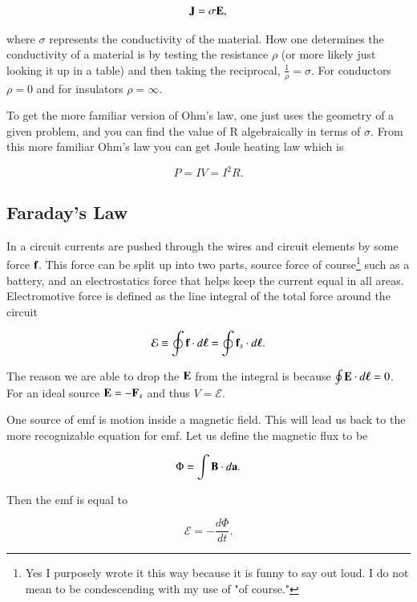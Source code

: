 \documentclass[preprint, review,12pt]{elsarticle}
\def\.{\cdot}
\def\b{\textbf}
\def\bell{\bm{\ell}}
\def\={\equiv}
\def\emf{\mathcal{E}}
\begin{document}
\begin{equation}
    \b J = \sigma \b E,
\end{equation}

where $\sigma$ represents the conductivity of the material. How one determines the conductivity of a material is by testing the resistance $\rho$ (or more likely just looking it up in a table) and then taking the reciprocal, $\frac{1}{\rho} = \sigma$. For conductors $\rho = 0$ and for insulators $\rho = \infty$.

To get the more familiar version of Ohm's law, one just uses the geometry of a given problem, and you can find the value of R algebraically in terms of $\sigma$. From this more familiar Ohm's law you can get Joule heating law which is

\begin{equation}
    P = IV = I^2R.
\end{equation}

\subsection{Faraday's Law}

In a circuit currents are pushed through the wires and circuit elements by some force $\b f$. This force can be split up into two parts, source force of course\footnote{Yes I purposely wrote it this way because it is funny to say out loud. I do not mean to be condescending with my use of "of course."} such as a battery, and an electrostatics force that helps keep the current equal in all areas. Electromotive force is defined as the line integral of the total force around the circuit

\begin{equation}
    \emf \= \oint \b f \. d\bell = \oint \b f_s \. d\bell.
\end{equation}

The reason we are able to drop the $\b E$ from the integral is because $\oint \b E \. d \bell = 0$. For an ideal source $\b E = - \b F_s$ and thus $V = \emf$.

One source of emf is motion inside a magnetic field. This will lead us back to the more recognizable equation for emf. Let us define the magnetic flux to be

\begin{equation}
    \Phi = \int \b B \. d\b a.
\end{equation}

Then the emf is equal to 

\begin{equation}
    \emf = - \frac{d\Phi}{dt}.
\end{equation}
\end{document}

